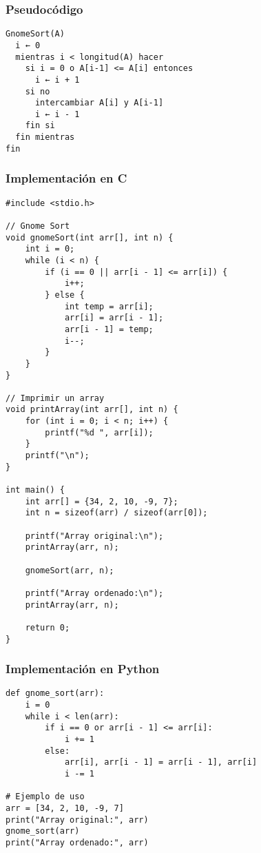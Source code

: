\documentclass[11pt,openany]{book}
\begin{document}
\subsubsection{Pseudocódigo}
\begin{verbatim}
GnomeSort(A)
  i ← 0
  mientras i < longitud(A) hacer
    si i = 0 o A[i-1] <= A[i] entonces
      i ← i + 1
    si no
      intercambiar A[i] y A[i-1]
      i ← i - 1
    fin si
  fin mientras
fin
\end{verbatim}


\subsubsection{Implementación en C}
\lstset{language=C}
\begin{lstlisting}
#include <stdio.h>

// Gnome Sort
void gnomeSort(int arr[], int n) {
    int i = 0;
    while (i < n) {
        if (i == 0 || arr[i - 1] <= arr[i]) {
            i++;
        } else {
            int temp = arr[i];
            arr[i] = arr[i - 1];
            arr[i - 1] = temp;
            i--;
        }
    }
}

// Imprimir un array
void printArray(int arr[], int n) {
    for (int i = 0; i < n; i++) {
        printf("%d ", arr[i]);
    }
    printf("\n");
}

int main() {
    int arr[] = {34, 2, 10, -9, 7};
    int n = sizeof(arr) / sizeof(arr[0]);

    printf("Array original:\n");
    printArray(arr, n);

    gnomeSort(arr, n);

    printf("Array ordenado:\n");
    printArray(arr, n);

    return 0;
}
\end{lstlisting}

\subsubsection{Implementación en Python}
\lstset{language=Python}
\begin{lstlisting}
def gnome_sort(arr):
    i = 0
    while i < len(arr):
        if i == 0 or arr[i - 1] <= arr[i]:
            i += 1
        else:
            arr[i], arr[i - 1] = arr[i - 1], arr[i]
            i -= 1

# Ejemplo de uso
arr = [34, 2, 10, -9, 7]
print("Array original:", arr)
gnome_sort(arr)
print("Array ordenado:", arr)
\end{lstlisting}
\end{document}
